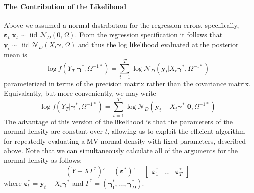 \documentclass[12pt]{article}
\begin{document}
\paragraph{The Contribution of the Likelihood}
Above we assumed a normal distribution for the regression errors, specifically, $\boldsymbol{\varepsilon}_t|\mathbf{x}_t \sim \mbox{ iid } \mathcal{N}_D(0,\Omega)$.
From the regression specification it follows that $\mathbf{y}_t \sim \mbox{ iid } \mathcal{N}_D\left(X_t \boldsymbol{\gamma}, \Omega\right)$ and thus the log likelihood evaluated at the posterior mean is
\begin{equation*}
\log f(Y_T| \boldsymbol{\gamma}^*,\Omega^{-1*}) = \sum_{t=1}^{T} \log{ \mathcal{N}_D \left(\mathbf{y}_t|X_t \boldsymbol{\gamma}^*, \Omega^{-1*}\right)}
\end{equation*}
parameterized in terms of the precision matrix rather than the covariance matrix.
Equivalently, but more conveniently, we may write
\begin{equation*}
\log f(Y_T| \boldsymbol{\gamma}^*,\Omega^{-1*}) = \sum_{t=1}^{T} \log{ \mathcal{N}_D \left(\mathbf{y}_t -X_t \boldsymbol{\gamma}^*|\mathbf{0}, \Omega^{-1*}\right)}
\end{equation*}
The advantage of this version of the likelihood is that the parameters of the normal density are constant over $t$, allowing us to exploit the efficient algorithm for repeatedly evaluating a MV normal density with fixed parameters, described above.
Note that we can simultaneously calculate all of the arguments for the normal density as follows:
\begin{equation*}
(\widetilde{Y} - \widetilde{X} \Gamma^*)'= (\boldsymbol{\varepsilon}^{*})' = \left[
\begin{array}{ccc}
\boldsymbol{\varepsilon}_1^* &
\hdots &
\boldsymbol{\varepsilon}_T^*
\end{array}\right]
\end{equation*}
where $\boldsymbol{\varepsilon}_t^* = \mathbf{y}_t - X_t \boldsymbol{\gamma}^*$ and $\Gamma^* = \left( \boldsymbol{\gamma}_1^*, \hdots,  \boldsymbol{\gamma}_D^*\right)$.
\end{document}
